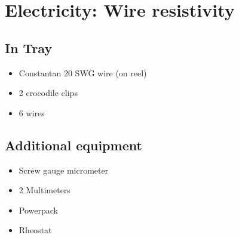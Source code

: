 \section{Electricity: Wire resistivity}


\subsection{In Tray}

\begin{itemize}
\item Constantan 20 SWG wire (on reel)
\item 2 crocodile clips
\item 6 wires
\end{itemize}


\subsection{Additional equipment}

\begin{itemize}
\item Screw gauge micrometer
\item 2 Multimeters
\item Powerpack
\item Rheostat
\end{itemize}
